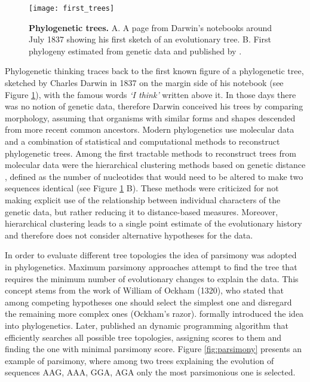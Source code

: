\begin{figure}[h!]
\centering
\texttt{[image: first\_trees]} 
\caption{
{ \footnotesize 
{\bf Phylogenetic trees.} A. A page from Darwin's notebooks around July 1837 showing his first sketch of an evolutionary tree.
B. First phylogeny estimated from genetic data and published by \cite{Fitch1967}.
}%
}
\label{fig:first_trees}
\end{figure}

Phylogenetic thinking traces back to the first known figure of a phylogenetic tree, sketched by Charles Darwin in 1837 on the margin side of his notebook (see Figure \ref{fig:first_trees}), with the famous words \emph{`I think'} written above it.
In those days there was no notion of genetic data, therefore Darwin conceived his trees by comparing morphology, assuming that organisms with similar forms and shapes descended from more recent common ancestors. %
Modern phylogenetics use molecular data and a combination of statistical and computational methods to reconstruct phylogenetic trees.
Among the first tractable methods to reconstruct trees from molecular data were the hierarchical clustering methods based on genetic distance \citep{Fitch1967}, defined as the number of nucleotides that would need to be altered to make two sequences identical (see Figure \ref{fig:first_trees} B).
These methods were criticized for not making explicit use of the relationship between individual characters of the genetic data, but rather reducing it to distance-based measures.
Moreover, hierarchical clustering leads to a single point estimate of the evolutionary history and therefore does not consider alternative hypotheses for the data.

In order to evaluate different tree topologies the idea of parsimony was adopted in phylogenetics. 
Maximum parsimony approaches attempt to find the tree that requires the minimum number of evolutionary changes to explain the data. %
This concept stems from the work of William of Ockham (1320), who stated that among competing hypotheses one should select the simplest one and disregard the remaining more complex ones (Ockham's razor).
\cite{Edwards1963} formally introduced the idea into phylogenetics.
Later, \cite{Fitch1971} published an dynamic programming algorithm that efficiently searches all possible tree topologies, assigning scores to them and finding the one with minimal parsimony score.
Figure \ref{fig:parsimony} presents an example of parsimony, where among two trees explaining the evolution of sequences {\color{green}AAG}, {\color{green}AAA}, {\color{green}GGA}, {\color{green}AGA} only the most parsimonious one is selected.

